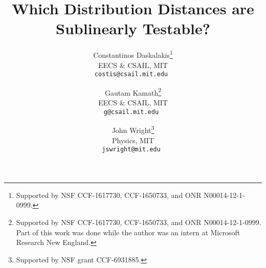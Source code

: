 \documentclass{article}
\title{Which Distribution Distances are Sublinearly Testable?}
\author {
Constantinos Daskalakis\thanks{Supported by NSF CCF-1617730, CCF-1650733, and ONR N00014-12-1-0999.}\\
EECS \& CSAIL, MIT\\
\tt{costis@csail.mit.edu}
\and
Gautam Kamath\thanks{Supported by NSF CCF-1617730, CCF-1650733, and ONR N00014-12-1-0999. Part of this work was done while the author was an intern at Microsoft Research New England.} \\
EECS \& CSAIL, MIT\\
\tt{g@csail.mit.edu}
\and
John Wright\thanks{Supported by NSF grant CCF-6931885.} \\
Physics, MIT\\
\tt{jswright@mit.edu}
}
\begin{document}
\maketitle
\begin{abstract}

\end{abstract}









\appendix

\end{document}
